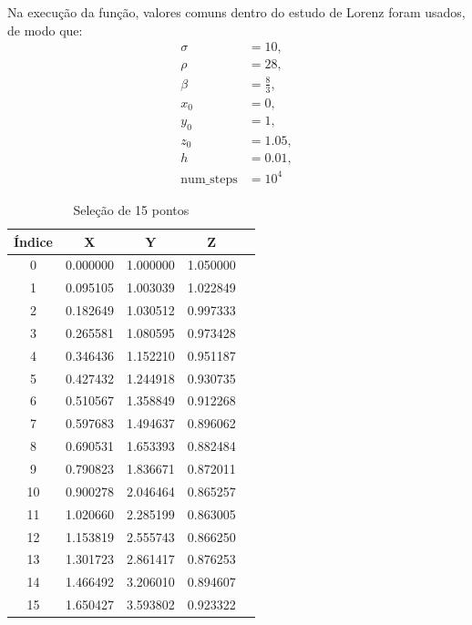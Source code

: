 \documentclass[12pt, a4paper]{article}
\begin{document}
    Na execução da função, valores comuns dentro do estudo de Lorenz foram
    usados, de modo que:
    \begin{equation}
        \begin{aligned}
            \sigma            & = 10,          \\
            \rho              & = 28,          \\
            \beta             & = \frac{8}{3}, \\
            x_0               & = 0,           \\
            y_0               & = 1,           \\
            z_0               & = 1.05,        \\
            h                 & = 0.01,        \\
            \text{num\_steps} & = 10^4
        \end{aligned}
    \end{equation}
    
    \begin{table}[H]
        \centering
        \begin{tabular}{|c|c|c|c|c|}
            \hline
            Índice & X        & Y        & Z        \\
            \hline
            0      & 0.000000 & 1.000000 & 1.050000 \\
            1      & 0.095105 & 1.003039 & 1.022849 \\
            2      & 0.182649 & 1.030512 & 0.997333 \\
            3      & 0.265581 & 1.080595 & 0.973428 \\
            4      & 0.346436 & 1.152210 & 0.951187 \\
            5      & 0.427432 & 1.244918 & 0.930735 \\
            6      & 0.510567 & 1.358849 & 0.912268 \\
            7      & 0.597683 & 1.494637 & 0.896062 \\
            8      & 0.690531 & 1.653393 & 0.882484 \\
            9      & 0.790823 & 1.836671 & 0.872011 \\
            10     & 0.900278 & 2.046464 & 0.865257 \\
            11     & 1.020660 & 2.285199 & 0.863005 \\
            12     & 1.153819 & 2.555743 & 0.866250 \\
            13     & 1.301723 & 2.861417 & 0.876253 \\
            14     & 1.466492 & 3.206010 & 0.894607 \\
            15     & 1.650427 & 3.593802 & 0.923322 \\
            \hline
        \end{tabular}
        \caption{Seleção de 15 pontos}
    \end{table}
    
\end{document}
